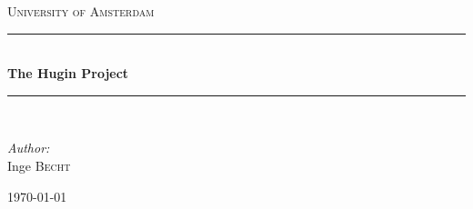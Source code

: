 \documentclass[12pt]{article} %
\begin{document}

\begin{titlepage}

    \newcommand{\HRule}{\rule{\linewidth}{0.5mm}} %

    \center %

    \textsc{\LARGE University of Amsterdam}\\[1.5cm] %

    \HRule \\[0.4cm]
    { \huge \bfseries The Hugin Project}\\[0.4cm] %
    \HRule \\[1.5cm]

    \begin{minipage}{0.4\textwidth}
        \begin{flushleft} \large
            \emph{Author:}\\
            Inge \textsc{Becht} %
        \end{flushleft}
    \end{minipage}

    {\large \today}\\[3cm] %


    \vfill %

\end{titlepage}


\tableofcontents %

\newpage %

\end{document}
